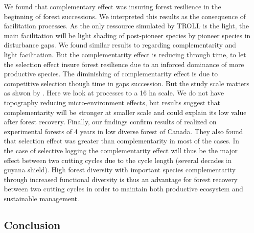 \documentclass[12pt,]{article}
\theoremstyle{definition}
\theoremstyle{definition}
\theoremstyle{remark}
\begin{document}
We found that complementary effect was insuring forest resilience in the
beginning of forest successions. We interpreted this results as the
consequence of facilitation processes. As the only ressource simulated
by TROLL is the light, the main facilitation will be light shading of
post-pioneer species by pioneer species in disturbance gaps. We found
similar results to \citet{Morin2011} regarding complementarity and light
facilitation. But the complementarity effect is reducing through time,
to let the selection effect insure forest resilience due to an inforced
dominance of more productive species. The diminishing of complementarity
effect is due to competitive selection though time in gaps succession.
But the study scale matters as shwon by \citet{Chisholm2013}. Here we
look at processes to a 16 ha scale. We do not have topography reducing
micro-environment effects, but \citet{Chisholm2013} results suggest that
complementarity will be stronger at smaller scale and could explain its
low value after forest recovery. Finally, our findings confirm results
of \citet{Tobner2016} realized on experimental forests of 4 years in low
diverse forest of Canada. They also found that selection effect was
greater than complementarity in most of the cases. In the case of
selective logging the complementarity effect will thus be the major
effect between two cutting cycles due to the cycle length (several
decades in guyana shield). High forest diversity with important species
complementarity through increased functional diversity is thus an
advantage for forest recovery between two cutting cycles in order to
maintain both productive ecosystem and sustainable management.

\subsection{Conclusion}\label{conclusion}
\end{document}
